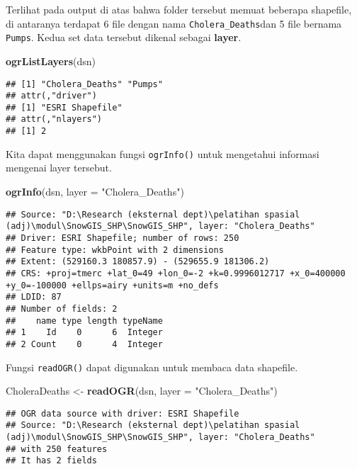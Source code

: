 \documentclass[
]{book}
\newenvironment{Shaded}{\begin{snugshade}}{\end{snugshade}}
\newcommand{\DataTypeTok}[1]{\textcolor[rgb]{0.13,0.29,0.53}{#1}}
\newcommand{\KeywordTok}[1]{\textcolor[rgb]{0.13,0.29,0.53}{\textbf{#1}}}
\newcommand{\NormalTok}[1]{#1}
\newcommand{\StringTok}[1]{\textcolor[rgb]{0.31,0.60,0.02}{#1}}
\begin{document}
Terlihat pada output di atas bahwa folder tersebut memuat beberapa shapefile, di antaranya terdapat 6 file dengan nama \texttt{Cholera\_Deaths}dan 5 file bernama \texttt{Pumps}. Kedua set data tersebut dikenal sebagai \textbf{layer}.

\begin{Shaded}
\begin{Highlighting}[]
\KeywordTok{ogrListLayers}\NormalTok{(dsn)}
\end{Highlighting}
\end{Shaded}

\begin{verbatim}
## [1] "Cholera_Deaths" "Pumps"         
## attr(,"driver")
## [1] "ESRI Shapefile"
## attr(,"nlayers")
## [1] 2
\end{verbatim}

Kita dapat menggunakan fungsi \texttt{ogrInfo()} untuk mengetahui informasi mengenai layer tersebut.

\begin{Shaded}
\begin{Highlighting}[]
\KeywordTok{ogrInfo}\NormalTok{(dsn, }\DataTypeTok{layer =} \StringTok{"Cholera\_Deaths"}\NormalTok{)}
\end{Highlighting}
\end{Shaded}

\begin{verbatim}
## Source: "D:\Research (eksternal dept)\pelatihan spasial (adj)\modul\SnowGIS_SHP\SnowGIS_SHP", layer: "Cholera_Deaths"
## Driver: ESRI Shapefile; number of rows: 250 
## Feature type: wkbPoint with 2 dimensions
## Extent: (529160.3 180857.9) - (529655.9 181306.2)
## CRS: +proj=tmerc +lat_0=49 +lon_0=-2 +k=0.9996012717 +x_0=400000 +y_0=-100000 +ellps=airy +units=m +no_defs 
## LDID: 87 
## Number of fields: 2 
##    name type length typeName
## 1    Id    0      6  Integer
## 2 Count    0      4  Integer
\end{verbatim}

Fungsi \texttt{readOGR()} dapat digunakan untuk membaca data shapefile.

\begin{Shaded}
\begin{Highlighting}[]
\NormalTok{CholeraDeaths \textless{}{-}}\StringTok{ }\KeywordTok{readOGR}\NormalTok{(dsn, }\DataTypeTok{layer =} \StringTok{"Cholera\_Deaths"}\NormalTok{)}
\end{Highlighting}
\end{Shaded}

\begin{verbatim}
## OGR data source with driver: ESRI Shapefile 
## Source: "D:\Research (eksternal dept)\pelatihan spasial (adj)\modul\SnowGIS_SHP\SnowGIS_SHP", layer: "Cholera_Deaths"
## with 250 features
## It has 2 fields
\end{verbatim}
\end{document}
